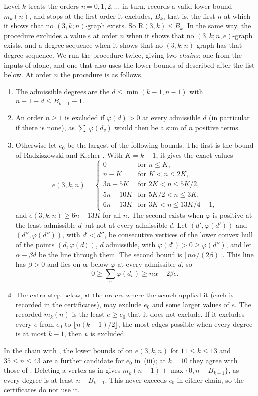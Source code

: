 \documentclass[11pt]{article}
\theoremstyle{spacedplain}
\theoremstyle{spaceddef}
\theoremstyle{spacedremark}
\newcommand{\R}{\mathrm{R}}
\begin{document}
Level $k$ treats the orders $n=0,1,2,\dots$ in turn, records a valid lower bound $m_k(n)$, and stops at the first order it excludes, $B_k$, that is, the first $n$ at which it shows that no $(3,k;n)$-graph exists.
So $\R(3,k)\le B_k$.
In the same way, the procedure excludes a value $e$ at order $n$ when it shows that no $(3,k;n,e)$-graph exists, and a degree sequence when it shows that no $(3,k;n)$-graph has that degree sequence.
We run the procedure twice, giving two \emph{chains}: one from the inputs of \cite{GR13} alone, and one that also uses the lower bounds of \cite{Back3} described after the list below.
At order $n$ the procedure is as follows.
\begin{enumerate}[label=(\roman*)]
\item The admissible degrees are the $d\le\min(k-1,n-1)$ with $n-1-d\le B_{k-1}-1$.
\item An order $n\ge 1$ is excluded if $\varphi(d)>0$ at every admissible $d$ (in particular if there is none), as $\sum_v\varphi(d_v)$ would then be a sum of $n$ positive terms.
\item Otherwise let $e_0$ be the largest of the following bounds.
The first is the bound of Radziszowski and Kreher \cite[Theorem~2]{GR13}.
With $K=k-1$, it gives the exact values
\[
e(3,k,n)=\begin{cases}
0 & \text{for } n\le K,\\
n-K & \text{for } K<n\le 2K,\\
3n-5K & \text{for } 2K<n\le 5K/2,\\
5n-10K & \text{for } 5K/2<n\le 3K,\\
6n-13K & \text{for } 3K<n\le 13K/4-1,
\end{cases}
\]
and $e(3,k,n)\ge 6n-13K$ for all $n$.
The second exists when $\varphi$ is positive at the least admissible $d$ but not at every admissible $d$.
Let $(d',\varphi(d'))$ and $(d'',\varphi(d''))$, with $d'<d''$, be consecutive vertices of the lower convex hull of the points $(d,\varphi(d))$, $d$ admissible, with $\varphi(d')>0\ge\varphi(d'')$, and let $\alpha-\beta d$ be the line through them.
The second bound is $\lceil n\alpha/(2\beta)\rceil$.
This line has $\beta>0$ and lies on or below $\varphi$ at every admissible $d$, so
\[
0\ge\sum_v\varphi(d_v)\ge n\alpha-2\beta e .
\]
\item The extra step below, at the orders where the search applied it (each is recorded in the certificates), may exclude $e_0$ and some larger values of $e$.
The recorded $m_k(n)$ is the least $e\ge e_0$ that it does not exclude.
If it excludes every $e$ from $e_0$ to $\lfloor n(k-1)/2\rfloor$, the most edges possible when every degree is at most $k-1$, then $n$ is excluded.
\end{enumerate}
In the chain with \cite{Back3}, the lower bounds of \cite{Back3} on $e(3,k,n)$ for $11\le k\le 13$ and $35\le n\le 43$ are a further candidate for $e_0$ in~(iii); at $k=10$ they agree with those of \cite{GR13}.
Deleting a vertex as in \cite[Lemma~3.5(a)]{DC26} gives $m_k(n-1)+\max\{0,n-B_{k-1}\}$, as every degree is at least $n-B_{k-1}$.
This never exceeds $e_0$ in either chain, so the certificates do not use it.
\end{document}
